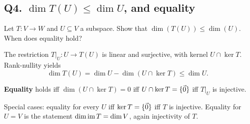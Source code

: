 \subsection{Q4. $\dim T(U)\le\dim U$, and equality}

\begin{promptbox}
Let $T:V\to W$ and $U\subseteq V$ a subspace. Show that $\dim(T(U))\le\dim(U)$.
When does equality hold?
\end{promptbox}

\begin{coursebox}
The restriction $T|_U:U\to T(U)$ is linear and surjective, with kernel
$U\cap\ker T$. Rank-nullity yields
\[
\dim T(U)=\dim U-\dim(U\cap\ker T)\le\dim U.
\]

\textbf{Equality} holds iff $\dim(U\cap\ker T)=0$ iff $U\cap\ker T=\{\vec{0}\}$
iff $T|_U$ is injective.

Special cases: equality for every $U$ iff $\ker T=\{\vec{0}\}$ iff $T$ is
injective. Equality for $U=V$ is the statement $\dim\operatorname{im} T=\dim V$, again
injectivity of $T$.
\end{coursebox}
